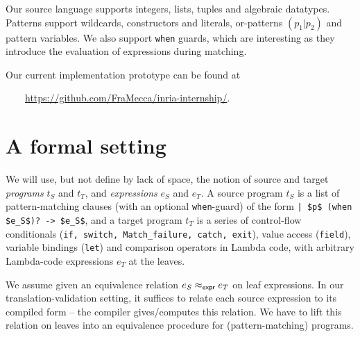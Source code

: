 \documentclass[12pt]{article}
\begin{document}
Our source language supports integers, lists, tuples and algebraic
datatypes. Patterns support wildcards, constructors and literals,
or-patterns $(p_1 | p_2)$ and pattern variables.  We also support
\texttt{when} guards, which are interesting as they introduce the
evaluation of expressions during matching.

Our current implementation prototype can be found at

$\qquad$\url{https://github.com/FraMecca/inria-internship/}.

\newpage
\appendix

\section{A formal setting}

We will use, but not define by lack of space, the notion of source and
target \emph{programs} $t_S$ and $t_T$, and \emph{expressions} $e_S$
and $e_T$. A source program $t_S$ is a list of pattern-matching
clauses (with an optional \texttt{when}-guard) of the form
\lstinline{| $p$ (when $e_S$)? -> $e_S$}, and a target program $t_T$
is a series of control-flow conditionals (\texttt{if, switch,
  Match\_failure, catch, exit}), value access (\texttt{field}),
variable bindings (\texttt{let}) and comparison operators in Lambda
code, with arbitrary Lambda-code expressions $e_T$ at the leaves.

We assume given an equivalence relation $e_S \mathrel{\approx_{\mathsf{expr}}} e_T$ on leaf
expressions. In our translation-validation setting, it suffices to
relate each source expression to its compiled form -- the compiler
gives/computes this relation. We have to lift this relation on leaves
into an equivalence procedure for (pattern-matching) programs.
\end{document}
